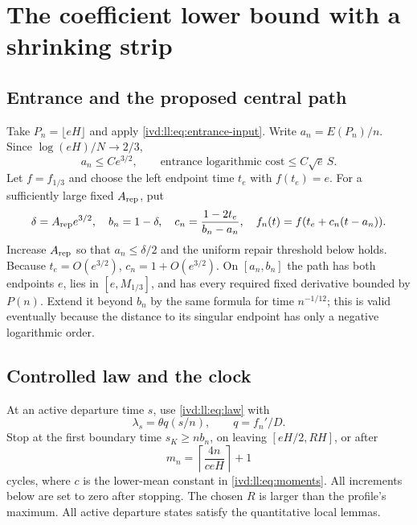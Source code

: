 \documentclass[11pt,letterpaper]{article}
\theoremstyle{remark}\newtheorem{remark}[theorem]{Remark}
\numberwithin{equation}{section}
\begin{document}
\section{The coefficient lower bound with a shrinking strip}\label{ivd:ll:sec:lower}
\subsection{Entrance and the proposed central path}
Take $P_n=\lfloor eH\rfloor$ and apply
\eqref{ivd:ll:eq:entrance-input}. Write $a_n=E(P_n)/n$. Since
$\log(eH)/N\to2/3$,
\begin{equation}\label{ivd:ll:eq:entrance-scale}
 a_n\le Ce^{3/2},\qquad
 \text{entrance logarithmic cost}\le C\sqrt e\,S.
\end{equation}
Let $f=f_{1/3}$ and choose the left endpoint time $t_e$ with
$f(t_e)=e$. For a sufficiently large fixed $A_{\rm rep}$, put
\begin{equation}\label{ivd:ll:eq:path}
 \delta=A_{\rm rep}e^{3/2},\quad b_n=1-\delta,\quad
 c_n=\frac{1-2t_e}{b_n-a_n},\quad
 f_n(t)=f(t_e+c_n(t-a_n)).
\end{equation}
Increase $A_{\rm rep}$ so that $a_n\le\delta/2$ and the
uniform repair threshold below holds. Because $t_e=O(e^{3/2})$,
$c_n=1+O(e^{3/2})$. On $[a_n,b_n]$ the path has both endpoints
$e$, lies in $[e,M_{1/3}]$, and has every required fixed derivative
bounded by $P(n)$. Extend it beyond $b_n$ by the same formula for
time $n^{-1/12}$; this is valid eventually because the distance
to its singular endpoint has only a negative logarithmic order.

\subsection{Controlled law and the clock}
At an active departure time $s$, use \eqref{ivd:ll:eq:law} with
\begin{equation}\label{ivd:ll:eq:control}
 \lambda_s=\theta q(s/n),\qquad q=f_n'/D.
\end{equation}
Stop at the first boundary time $s_K\ge nb_n$, on leaving
$[eH/2,RH]$, or after
\begin{equation}\label{ivd:ll:eq:cap}
 m_n=\left\lceil\frac{4n}{c eH}\right\rceil+1
\end{equation}
cycles, where $c$ is the lower-mean constant in
\eqref{ivd:ll:eq:moments}. All increments below are set to zero after
stopping. The chosen $R$ is larger than the profile's maximum.
All active departure states satisfy the quantitative local lemmas.
\end{document}
